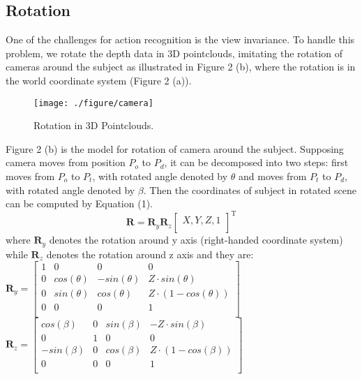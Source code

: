\documentclass[conference]{IEEEtran}
\begin{document}
\subsection{Rotation}
One of the challenges for action recognition is the view invariance. To handle this problem, we rotate the depth data in 3D pointclouds, imitating the rotation of cameras around the subject as illustrated in Figure 2 (b), where the rotation is in the world coordinate system (Figure 2 (a)).
\begin{figure}[!ht]
\begin{center}{\texttt{[image: ./figure/camera]}}
\end{center}
\caption{Rotation in 3D Pointclouds.}
\label{fig:framework}
\end{figure}

Figure 2 (b) is the model for rotation of camera around the subject. Supposing camera moves from position $P_{o}$ to $P_{d}$, it can be decomposed into two steps: first moves from $P_{o}$ to $P_{t}$, with rotated angle denoted by $\theta$ and moves from $P_{t}$ to $P_{d}$, with rotated angle denoted by $\beta$. Then the coordinates of subject in rotated scene can be computed by Equation (1).\\
\begin{equation}
\mathbf R  = \mathbf R_{y}\mathbf R_{z}
\begin{bmatrix}
 X, Y, Z, 1 \\
\end{bmatrix}^ \mathrm{ T }
\end{equation}
where $\mathbf R_{y}$ denotes the rotation around y axis (right-handed coordinate system) while $\mathbf R_{z}$ denotes the rotation around z axis and they are: \\
$\mathbf R_{y} =
\begin{bmatrix}
 1 & 0 & 0 & 0\\
 0 & cos(\theta) & -sin(\theta) & Z\cdot sin(\theta)\\
 0 & sin(\theta) & cos(\theta) & Z\cdot (1 - cos(\theta))\\
 0 & 0 & 0 & 1\\
\end{bmatrix}$\\
$\mathbf R_{z} =
\begin{bmatrix}
 cos(\beta) & 0 & sin(\beta) & -Z\cdot sin(\beta)\\
 0 & 1 & 0 & 0\\
 -sin(\beta) & 0 & cos(\beta) & Z\cdot (1 - cos(\beta))\\
 0 & 0 & 0 & 1\\
\end{bmatrix} $\\
\end{document}
